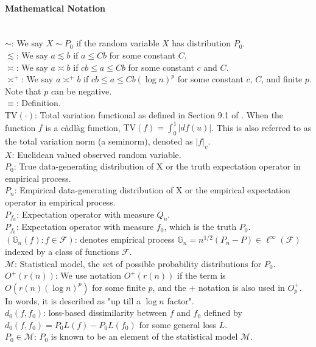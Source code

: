 \paragraph{Mathematical Notation}~\\
$\sim$: We say $X \sim P_0$ if the random variable $X$ has distribution $P_0$. \\
$\lesssim$: We say $a \lesssim b$ if $a \leq Cb$ for some constant $C$.\\
$\asymp$: We say $a \asymp b$ if $cb \leq a \leq Cb$ for some constant $c$ and $C$. \\
$\asymp^+$: We say $a \asymp^+ b$ if $cb \leq a \leq 
Cb(\log n)^p$ for some constant $c$, $C$, and finite $p$. Note that $p$ can be negative. \\
$\equiv$: Definition.\\
$\mathrm{TV}(\cdot)$: Total variation functional as defined in Section 9.1 of \citet{tibshirani2022divided}. When the function $f$ is a càdlàg function, $\mathrm{TV}(f) = \int_0^1 |df(u)|$. This is also referred to as the total variation norm (a seminorm), denoted as $|f|_v$. \\
$X$: Euclidean valued observed random variable. \\
$P_0$: True data-generating distribution of X or the truth expectation operator in empirical process. \\
$P_n$: Empirical data-generating distribution of X or the empirical expectation operator in empirical process. \\
$P_{f_n}$: Expectation operator with measure $Q_n$. \\
$P_{f_0}$: Expectation operator with measure $f_0$, which is the truth $P_0$. \\
$(\mathbb{G}_n(f) : f \in \mathcal{F})$: denotes empirical process $\mathbb{G}_n = n^{1/2}(P_n - P) \in \ell^{\infty}(\mathcal{F})$ indexed by a class of functions $\mathcal{F}$.\\
$\mathcal{M}$: Statistical model, the set of possible probability distributions for $P_0$.\\
$O^+(r(n))$: We use notation $O^+(r(n))$ if the term is $O(r(n)(\log n)^p)$ for some finite $p$, and the $+$ notation is also used in $O_p^+$. In words, it is described as "up till a $\log n$ factor".\\
$d_0(f, f_0)$: loss-based dissimilarity between $f$ and $f_0$ defined by $d_0(f, f_0) = P_0L(f) - P_0L(f_0)$ for some general loss $L$.\\
$P_0 \in \mathcal{M}$: $P_0$ is known to be an element of the statistical model $\mathcal{M}$.\\

